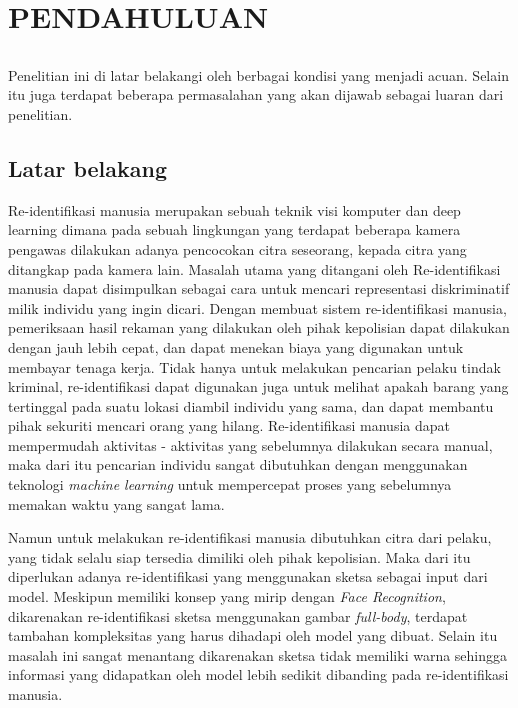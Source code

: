 \chapter{PENDAHULUAN}
\vspace{1ex}

\section*{}
Penelitian ini di latar belakangi oleh berbagai kondisi yang menjadi acuan. Selain itu juga terdapat beberapa permasalahan yang akan dijawab sebagai luaran dari penelitian.
\vspace{1ex}

\section{Latar belakang}
\vspace{1ex}

Re-identifikasi manusia merupakan sebuah teknik visi komputer dan deep learning dimana pada sebuah lingkungan yang terdapat beberapa kamera pengawas dilakukan adanya pencocokan citra seseorang, kepada citra yang ditangkap pada kamera lain. Masalah utama yang ditangani oleh Re-identifikasi manusia dapat disimpulkan sebagai cara untuk mencari representasi diskriminatif milik individu yang ingin dicari. Dengan membuat sistem re-identifikasi manusia, pemeriksaan hasil rekaman yang dilakukan oleh pihak kepolisian dapat dilakukan dengan jauh lebih cepat, dan dapat menekan biaya yang digunakan untuk membayar tenaga kerja. Tidak hanya  untuk melakukan pencarian pelaku tindak kriminal, re-identifikasi dapat digunakan juga untuk melihat apakah barang yang tertinggal pada suatu lokasi diambil individu yang sama, dan dapat membantu pihak sekuriti mencari orang yang hilang. Re-identifikasi manusia dapat mempermudah aktivitas - aktivitas yang sebelumnya dilakukan secara manual, maka dari itu pencarian individu sangat dibutuhkan dengan menggunakan teknologi \textit{machine learning} untuk mempercepat proses yang sebelumnya memakan waktu yang sangat lama.

Namun untuk melakukan re-identifikasi manusia dibutuhkan citra dari pelaku, yang tidak selalu siap tersedia dimiliki oleh pihak kepolisian. Maka dari itu diperlukan adanya re-identifikasi yang menggunakan sketsa sebagai input dari model. Meskipun memiliki konsep yang mirip dengan \textit{Face Recognition}, dikarenakan re-identifikasi sketsa menggunakan gambar \textit{full-body}, terdapat tambahan kompleksitas yang harus dihadapi oleh model yang dibuat. Selain itu masalah ini sangat menantang dikarenakan sketsa tidak memiliki warna sehingga informasi yang didapatkan oleh model lebih sedikit dibanding pada re-identifikasi manusia. 

